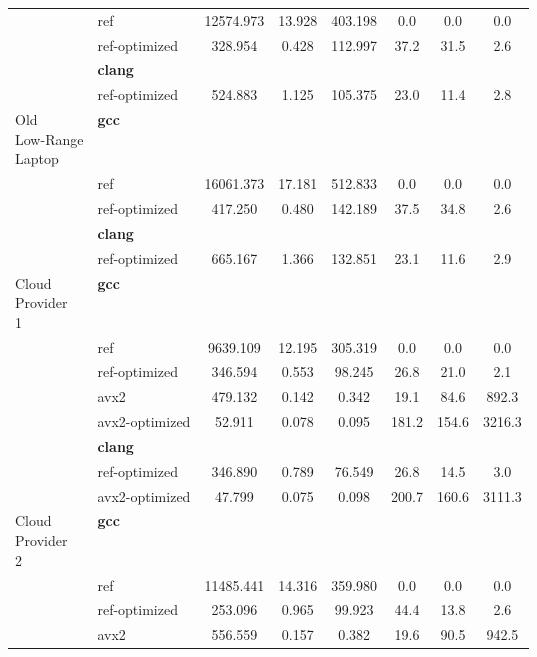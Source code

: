 \begin{table}
\begin{tabularx}{\linewidth}{l l c c c c c c}
          & ref & 12574.973 & 13.928 & 403.198 & 0.0 & 0.0 & 0.0\\
          & ref-optimized & 328.954 & 0.428 & 112.997 & 37.2 & 31.5 & 2.6\\
          & \textbf{clang} & & & & & \\
          & ref-optimized & 524.883 & 1.125 & 105.375 & 23.0 & 11.4 & 2.8\\
          \midrule
          \multirowcell{5}{Old\\ Low-Range\\ Laptop}
          & \textbf{gcc} & & & & & \\
          & ref & 16061.373 & 17.181 & 512.833 & 0.0 & 0.0 & 0.0\\
          & ref-optimized & 417.250 & 0.480 & 142.189 & 37.5 & 34.8 & 2.6\\
          & \textbf{clang} & & & & & \\
          & ref-optimized & 665.167 & 1.366 & 132.851 & 23.1 & 11.6 & 2.9\\
          \midrule
          \multirowcell{8}{Cloud\\ Provider\\ 1}
          & \textbf{gcc} & & & & & \\
          & ref & 9639.109 & 12.195 & 305.319 & 0.0 & 0.0 & 0.0\\
          & ref-optimized & 346.594 & 0.553 & 98.245 & 26.8 & 21.0 & 2.1\\
          & avx2 & 479.132 & 0.142 & 0.342 & 19.1 & 84.6 & 892.3\\
          & avx2-optimized & 52.911 & 0.078 & 0.095 & 181.2 & 154.6 & 3216.3\\
          & \textbf{clang} & & & & & \\
          & ref-optimized & 346.890 & 0.789 & 76.549 & 26.8 & 14.5 & 3.0\\
          & avx2-optimized & 47.799 & 0.075 & 0.098 & 200.7 & 160.6 & 3111.3\\
          \midrule
          \multirowcell{8}{Cloud\\ Provider\\ 2}
          & \textbf{gcc} & & & & & \\
          & ref & 11485.441 & 14.316 & 359.980 & 0.0 & 0.0 & 0.0\\
          & ref-optimized & 253.096 & 0.965 & 99.923 & 44.4 & 13.8 & 2.6\\
          & avx2 & 556.559 & 0.157 & 0.382 & 19.6 & 90.5 & 942.5\\

\end{tabularx}
\end{table}
